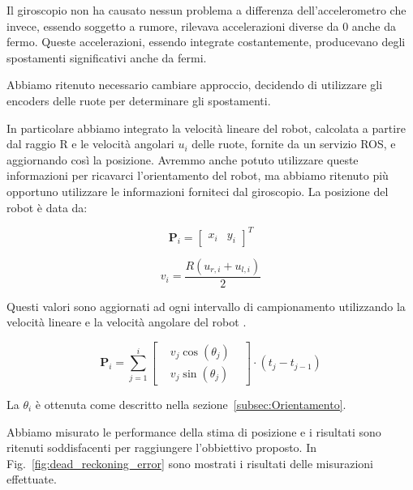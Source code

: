 \documentclass[a4paper]{article}
\begin{document}
	Il giroscopio non ha causato nessun problema a differenza
	dell'accelerometro che invece, essendo soggetto a rumore, rilevava
	accelerazioni diverse da 0 anche da fermo. Queste accelerazioni, essendo
	integrate costantemente, producevano degli spostamenti significativi anche
	da fermi. 
	
	Abbiamo ritenuto necessario cambiare approccio, decidendo di utilizzare gli
	encoders delle ruote per determinare gli spostamenti. 
	
	In particolare abbiamo integrato la velocità lineare del robot, calcolata a
	partire dal raggio R e le velocità angolari $u_i$ delle ruote, fornite da
	un servizio ROS, e aggiornando così la posizione. Avremmo anche potuto
	utilizzare queste informazioni per ricavarci l'orientamento del robot, ma
	abbiamo ritenuto più opportuno utilizzare le informazioni forniteci dal
	giroscopio. La posizione del robot è data da:
	
	\begin{equation}\label{eq:position-vector}
		\textbf{P}_i = \begin{bmatrix}
			  x_i & y_i  
		\end{bmatrix}^T
	\end{equation}
	
	\begin{equation}\label{eq:linear-velocity}
		v_i = \frac{R (u_{r,i}+u_{l,i})}{2}
	\end{equation}
	
	Questi valori sono aggiornati ad ogni intervallo di campionamento utilizzando la velocità lineare e la velocità angolare del robot \cite{572228}.
	
	\begin{equation}\label{eq:position-vector-update}
		\textbf{P}_i = \sum_{j = 1}^{i} \begin{bmatrix}
			 & v_j\cos(\theta_j ) & \\
			 & v_j\sin(\theta_j )
		\end{bmatrix}\cdot (t_j-t_{j-1}) 
	\end{equation}

	La $\theta_i$ è ottenuta come descritto nella sezione~\ref{subsec:Orientamento}.
	
	Abbiamo misurato le performance della stima di posizione e i risultati sono ritenuti soddisfacenti per raggiungere l'obbiettivo proposto. In Fig.~\ref{fig:dead_reckoning_error} sono mostrati i risultati delle misurazioni effettuate.
	
\end{document}

